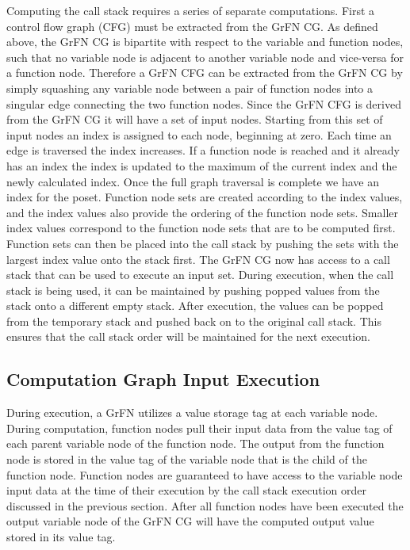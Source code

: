 Computing the call stack requires a series of separate computations.
First a control flow graph (CFG) must be extracted from the GrFN CG.
As defined above, the GrFN CG is bipartite with respect to the variable and function nodes, such that no variable node is adjacent to another variable node and vice-versa for a function node.
Therefore a GrFN CFG can be extracted from the GrFN CG by simply squashing any variable node between a pair of function nodes into a singular edge connecting the two function nodes.
Since the GrFN CFG is derived from the GrFN CG it will have a set of input nodes.
Starting from this set of input nodes an index is assigned to each node, beginning at zero.
Each time an edge is traversed the index increases.
If a function node is reached and it already has an index the index is updated to the maximum of the current index and the newly calculated index.
Once the full graph traversal is complete we have an index for the poset.
Function node sets are created according to the index values, and the index values also provide the ordering of the function node sets.
Smaller index values correspond to the function node sets that are to be computed first.
Function sets can then be placed into the call stack by pushing the sets with the largest index value onto the stack first.
The GrFN CG now has access to a call stack that can be used to execute an input set.
During execution, when the call stack is being used, it can be maintained by pushing popped values from the stack onto a different empty stack.
After execution, the values can be popped from the temporary stack and pushed back on to the original call stack. This ensures that the call stack order will be maintained for the next execution.

\subsection{Computation Graph Input Execution\label{sec:input_execution}}
During execution, a GrFN utilizes a value storage tag at each variable node.
During computation, function nodes pull their input data from the value tag of each parent variable node of the function node.
The output from the function node is stored in the value tag of the variable node that is the child of the function node.
Function nodes are guaranteed to have access to the variable node input data at the time of their execution by the call stack execution order discussed in the previous section.
After all function nodes have been executed the output variable node of the GrFN CG will have the computed output value stored in its value tag.

